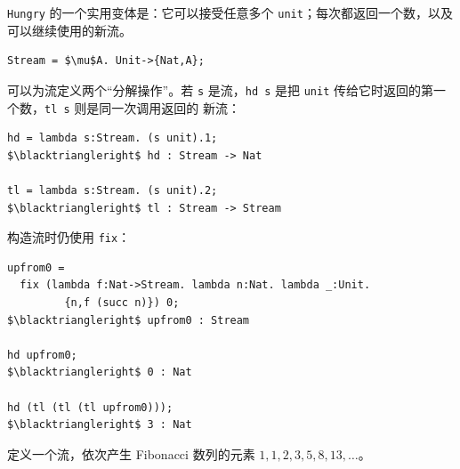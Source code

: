 \texttt{Hungry} 的一个实用变体是：它可以接受任意多个
\texttt{unit}；每次都返回一个数，以及可以继续使用的新流。
\begin{lstlisting}[mathescape=true]
Stream = $\mu$A. Unit->{Nat,A};
\end{lstlisting}
可以为流定义两个“分解操作”。若 \texttt{s} 是流，\texttt{hd s} 是把
\texttt{unit} 传给它时返回的第一个数，\texttt{tl s} 则是同一次调用返回的
新流：
\begin{lstlisting}[mathescape=true]
hd = lambda s:Stream. (s unit).1;
$\blacktriangleright$ hd : Stream -> Nat

tl = lambda s:Stream. (s unit).2;
$\blacktriangleright$ tl : Stream -> Stream
\end{lstlisting}
构造流时仍使用 \texttt{fix}：
\begin{lstlisting}[mathescape=true]
upfrom0 =
  fix (lambda f:Nat->Stream. lambda n:Nat. lambda _:Unit.
         {n,f (succ n)}) 0;
$\blacktriangleright$ upfrom0 : Stream

hd upfrom0;
$\blacktriangleright$ 0 : Nat

hd (tl (tl (tl upfrom0)));
$\blacktriangleright$ 3 : Nat
\end{lstlisting}


\begin{exercise}
\label{ex:20.1.2}
定义一个流，依次产生 Fibonacci 数列的元素
\(1,1,2,3,5,8,13,\ldots\)。
\end{exercise}

